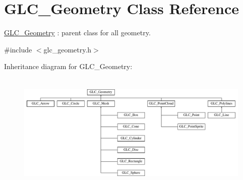 \hypertarget{class_g_l_c___geometry}{\section{G\-L\-C\-\_\-\-Geometry Class Reference}
\label{class_g_l_c___geometry}
}


\hyperlink{class_g_l_c___geometry}{G\-L\-C\-\_\-\-Geometry} \-: parent class for all geometry.  




{\ttfamily \#include $<$glc\-\_\-geometry.\-h$>$}

Inheritance diagram for G\-L\-C\-\_\-\-Geometry\-:\begin{figure}[H]
\begin{center}
\leavevmode
\includegraphics[height=5.663717cm]{class_g_l_c___geometry}
\end{center}
\end{figure}
